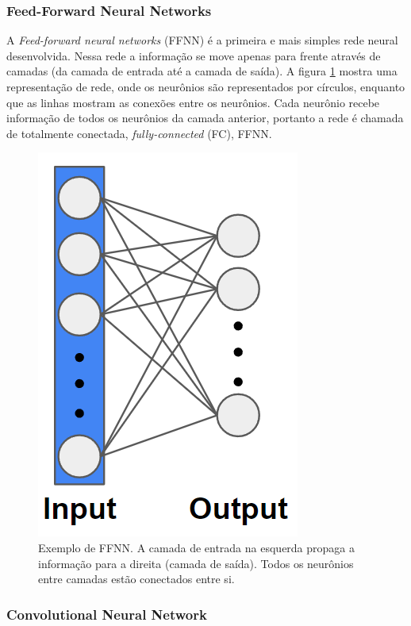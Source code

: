 \documentclass[a4paper,12pt,oneside]{book}
\begin{document}
\subsubsection*{Feed-Forward Neural Networks}

\par A \textit{Feed-forward neural networks} (FFNN) é a primeira e mais simples rede neural desenvolvida\cite{talent_ml, bishop2016pattern}. Nessa rede a informação se move apenas para frente através de camadas (da camada de entrada até a camada de saída). A figura \ref{fig:FFNN} mostra uma representação de rede, onde os neurônios são representados por círculos, enquanto que as linhas mostram as conexões entre os neurônios. Cada neurônio recebe informação de todos os neurônios da camada anterior, portanto a rede é chamada de totalmente conectada, \textit{fully-connected} (FC), FFNN. 

\begin{figure}[H]
    \centering
    \includegraphics[scale = 0.55]{figs/FFNN.png}
    \caption{Exemplo de FFNN. A camada de entrada na esquerda propaga a informação para a direita (camada de saída). Todos os neurônios entre camadas estão conectados entre si.}
    \label{fig:FFNN}
\end{figure}

\subsubsection*{Convolutional Neural Network}
\end{document}
